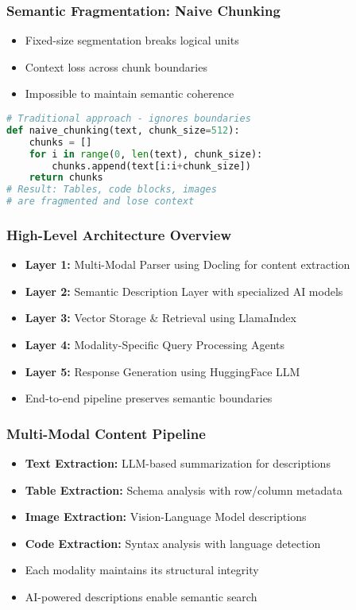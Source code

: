 \begin{frame}[fragile]\frametitle{Semantic Fragmentation: Naive Chunking}
\begin{itemize}
\item Fixed-size segmentation breaks logical units
\item Context loss across chunk boundaries
\item Impossible to maintain semantic coherence
\end{itemize}
\begin{lstlisting}[language=Python, basicstyle=\tiny]
# Traditional approach - ignores boundaries
def naive_chunking(text, chunk_size=512):
    chunks = []
    for i in range(0, len(text), chunk_size):
        chunks.append(text[i:i+chunk_size])
    return chunks
# Result: Tables, code blocks, images 
# are fragmented and lose context
\end{lstlisting}

\end{frame}

\begin{frame}[fragile]\frametitle{High-Level Architecture Overview}
\begin{itemize}
\item \textbf{Layer 1:} Multi-Modal Parser using Docling for content extraction
\item \textbf{Layer 2:} Semantic Description Layer with specialized AI models
\item \textbf{Layer 3:} Vector Storage \& Retrieval using LlamaIndex
\item \textbf{Layer 4:} Modality-Specific Query Processing Agents
\item \textbf{Layer 5:} Response Generation using HuggingFace LLM
\item End-to-end pipeline preserves semantic boundaries
\end{itemize}
\end{frame}

\begin{frame}[fragile]\frametitle{Multi-Modal Content Pipeline}
\begin{itemize}
\item \textbf{Text Extraction:} LLM-based summarization for descriptions
\item \textbf{Table Extraction:} Schema analysis with row/column metadata
\item \textbf{Image Extraction:} Vision-Language Model descriptions
\item \textbf{Code Extraction:} Syntax analysis with language detection
\item Each modality maintains its structural integrity
\item AI-powered descriptions enable semantic search
\end{itemize}
\end{frame}

